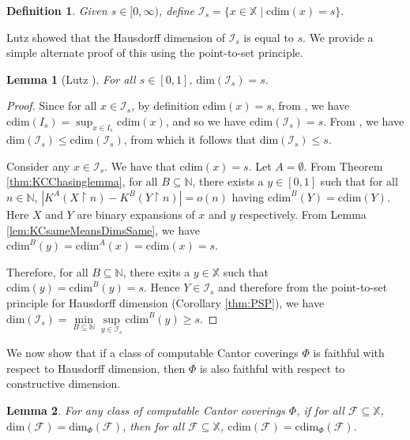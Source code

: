 \documentclass[11pt]{article}
\newtheorem{lemma}{Lemma}
\newtheorem{definition}{Definition}
\newcommand{\restr}{\upharpoonright}
\newcommand{\N}{\mathbb{N}}
\newcommand{\cdim}{\mathrm{cdim}}
\renewcommand{\dim}{{\mathrm{dim}}}
\newcommand{\F}{{\mathcal{F}}}
\newcommand{\X}{{\mathbb{X}}}
\renewcommand{\F}{\mathcal{F}}
\newcommand{\x}{x}
\begin{document}
\begin{definition} \label{Def:TBD}
	Given $s \in [0, \infty)$, define $ \mathcal{I}_s = \{\x \in \X \;\vert\; \cdim(\x) = s\}.$
\end{definition}

Lutz \cite{Lutz2003b} showed that the Hausdorff dimension of $\mathcal{I}_s$ is equal to $s$. We provide a simple alternate proof of this using the point-to-set principle.


\begin{lemma}[Lutz \cite{Lutz2003b}] \label{lem:dimEsequalss}
	For all $s \in [0, 1]$, $\dim(\mathcal{I}_s) = s.$
\end{lemma}

\begin{proof}
	Since for all $\x \in \mathcal{I}_s$, by definition $\cdim(\x) =
	s$, from  \cite{Lutz2003b}, we have  $\cdim(I_s) = \sup_{x \in I_s} \cdim(x)$, and so we have
	$\cdim(\mathcal{I}_s) = s$. From \cite{Lutz2003b}, we have  $\dim(\mathcal{I}_s)
	\leq \cdim(\mathcal{I}_s)$, from which it follows that
	$\dim(\mathcal{I}_s) \leq s$.
	
	Consider any $\x \in \mathcal{I}_s$. We have that $\cdim(\x) = s$. 
	Let $A =
	\emptyset$. From Theorem \ref{thm:KCChasinglemma},  for all $B \subseteq \N$, there
	exists a $y \in [0,1]$ such that for all $n \in \N$,  $|K^A(X
	\restr n) - K^B(Y \restr n)| = o(n)$ having
	$\cdim^B(Y) = \cdim(Y)$. 	Here $X$ and $Y$ are binary expansions of $x$ and $y$ respectively.
	From Lemma \ref{lem:KCsameMeansDimsSame}, we have 
	$\cdim^B(y) = \cdim^A(x) = \cdim(x) = s$. 
	
	Therefore,  for all $B \subseteq \N$, there exits a $y \in \X$ such that  $\cdim(y) = \cdim^B(y) = s$.  Hence $Y \in \mathcal{I}_s$ and therefore from the point-to-set principle for Hausdorff dimension (Corollary \ref{thm:PSP}), we have  $\dim(\mathcal{I}_s) = \min\limits_{B \subseteq \N} \sup\limits_{y \in \mathcal{I}_s} \cdim^B(y) \geq s$. 
\end{proof}

We now show that if a class of computable Cantor coverings $\Phi$ is faithful with respect to Hausdorff dimension, then $\Phi$ is also faithful with respect to constructive dimension.

\begin{lemma} \label{lem:Cantor2}
	For any class of computable Cantor coverings $\Phi$, if for all $\F \subseteq \X$, $\dim(\F) = \dim_\Phi(\F)$, 
	then for all $\F \subseteq \X$, $\cdim(\F) = \cdim_\Phi(\F)$.
\end{lemma}
\end{document}
